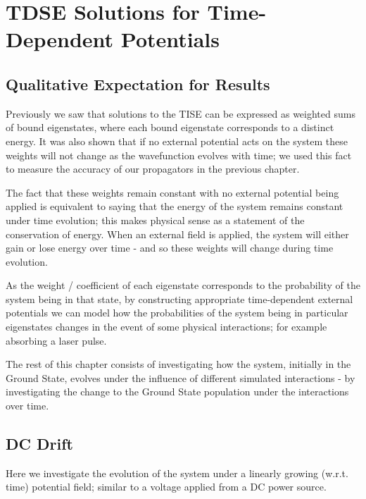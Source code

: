 
\chapter{TDSE Solutions for Time-Dependent Potentials} %

\label{Chapter4} %

\section{Qualitative Expectation for Results}
Previously we saw that solutions to the TISE can be expressed as weighted sums of bound eigenstates, where each bound eigenstate corresponds to a distinct energy. It was also shown that if no external potential acts on the system these weights will not change as the wavefunction evolves with time; we used this fact to measure the accuracy of our propagators in the previous chapter. 

The fact that these weights remain constant with no external potential being applied is equivalent to saying that the energy of the system remains constant under time evolution; this makes physical sense as a statement of the conservation of energy. When an external field is applied, the system will either gain or lose energy over time - and so these weights will change during time evolution. 

As the weight / coefficient of each eigenstate corresponds to the probability of the system being in that state, by constructing appropriate time-dependent external potentials we can model how the probabilities of the system being in particular eigenstates changes in the event of some physical interactions; for example absorbing a laser pulse. 

The rest of this chapter consists of investigating how the system, initially in the Ground State, evolves under the influence of different simulated interactions - by investigating the change to the Ground State population under the interactions over time.

\section{DC Drift}
Here we investigate the evolution of the system under a linearly growing (w.r.t. time) potential field; similar to a voltage applied from a DC power source.

